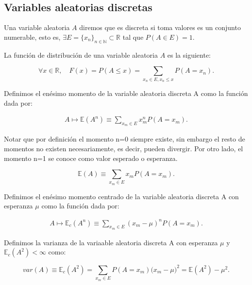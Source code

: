 \documentclass[../proyecto.tex]{memoir}
\begin{document}
\subsection{Variables aleatorias discretas}

\begin{defi}
Una variable aleatoria $A$ diremos que es discreta si toma valores es un conjunto numerable, esto es, $\exists E=\{x_n\}_{n \in \mathds{N}} \subset \mathds{R}$ tal que $P(A \in E)=1$. 
\end{defi}


\begin{defi}
La función de distribución de una variable aleatoria $A$ es la siguiente: 

$$
\forall x\in \mathds{R}, \quad F(x) = P( A \leq x) = \sum_{x_n\in E, x_n \leq x} P(A=x_n).
$$
\end{defi}

\begin{defi}
Definimos el enésimo momento de la variable aleatoria discreta A como la función dada por:

\begin{align*}
A \mapsto \mathds{E}(A^n) \equiv \sum_{x_m \in E} x_m^n P(A=x_m).
\end{align*}
\end{defi}

Notar que por definición el momento n=0 siempre existe, sin embargo el resto de momentos no existen necesariamente, es decir, pueden divergir. Por otro lado, el momento n=1 se conoce como valor esperado o esperanza.

$$
\mathds{E}(A) \equiv \sum_{x_m \in E} x_m P(A=x_m).
$$

\begin{defi}
Definimos el enésimo momento centrado de la variable aleatoria discreta A con esperanza $\mu$ como la función dada por:

\begin{align*}
A \mapsto \mathds{E}_c(A^n) \equiv \sum_{x_m \in E} (x_m - \mu)^n P(A=x_m).
\end{align*}
\end{defi}


\begin{defi}
Definimos la varianza de la variaable aleatoria discreta A con esperanza $\mu$ y $\mathds{E}_c(A^2) < \infty $ como:

$$
var(A) \equiv \mathds{E}_c(A^2) = \sum_{x_m\in E} P(A=x_m) \big(x_m - \mu\big)^2 = \mathds{E}(A^2) - \mu^2.
$$
\end{defi}
\end{document}
